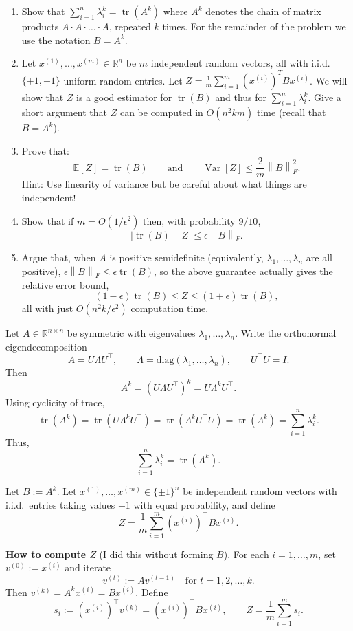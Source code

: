 \documentclass[10pt]{article}
\newcommand{\R}{\mathbb{R}}
\newcommand{\E}{\mathbb{E}}
\DeclareMathOperator{\Var}{Var}
\DeclareMathOperator{\tr}{tr}
\newcommand{\norm}[1]{\left\lVert #1\right\rVert}
\newcommand{\spara}[1]{\vspace{.5em}\noindent {\large\sffamily\textcolor{nyuOfficialPurple}{#1}}}
\begin{document}
\begin{enumerate}
	\item Show that $\sum_{i=1}^n \lambda_i^k = \tr(A^k)$ where $A^k$ denotes the chain of matrix products $A \cdot A \cdot \ldots \cdot A$, repeated $k$ times. For the remainder of the problem we use the notation $B = A^k$.
	\item Let $x^{(1)}, \ldots, x^{(m)} \in \R^n$ be $m$ independent random vectors, all with i.i.d. $\{+1, -1\}$ uniform random entries. Let $Z = \frac{1}{m} \sum_{i=1}^m (x^{(i)})^T B x^{(i)}$. We will show that $Z$ is a good estimator for $\tr(B)$ and thus for $\sum_{i=1}^n \lambda_i^k$. Give a short argument that $Z$ can be computed in $O(n^2 k m)$ time (recall that $B = A^k$).
	\item Prove that:
	\[
	\E[Z] = \tr(B)
	\qquad\text{and}\qquad
	\Var[Z] \le \frac{2}{m} \norm{B}_F^2.
	\]
	Hint: Use linearity of variance but be careful about what things are independent!
	\item Show that if $m = O(1/\epsilon^2)$ then, with probability $9/10$,
	\[
	|\tr(B) - Z| \le \epsilon \norm{B}_F.
	\]
	\item Argue that, when $A$ is positive semidefinite (equivalently, $\lambda_1, \ldots, \lambda_n$ are all positive), $\epsilon \norm{B}_F \le \epsilon \tr(B)$, so the above guarantee actually gives the relative error bound,
	\[
	(1-\epsilon)\tr(B) \le Z \le (1+\epsilon)\tr(B),
	\]
	all with just $O(n^2 k/\epsilon^2)$ computation time.
\end{enumerate}

\spara{Pr. 1(a)}
Let $A\in\R^{n\times n}$ be symmetric with eigenvalues $\lambda_1,\dots,\lambda_n$. Write the orthonormal eigendecomposition
\[
A = U\Lambda U^\top,
\qquad
\Lambda=\mathrm{diag}(\lambda_1,\dots,\lambda_n),
\qquad
U^\top U=I.
\]
Then
\[
A^k=(U\Lambda U^\top)^k = U\Lambda^k U^\top.
\]
Using cyclicity of trace,
\[
\tr(A^k)=\tr(U\Lambda^k U^\top)=\tr(\Lambda^k U^\top U)=\tr(\Lambda^k)
=\sum_{i=1}^n \lambda_i^k.
\]
Thus,
\[
\boxed{\sum_{i=1}^n \lambda_i^k=\tr(A^k).}
\]

\medskip
\spara{Pr. 1(b)}
Let $B:=A^k$. Let $x^{(1)},\dots,x^{(m)}\in\{\pm 1\}^n$ be independent random vectors with i.i.d.\ entries taking values $\pm 1$ with equal probability, and define
\[
Z=\frac{1}{m}\sum_{i=1}^m (x^{(i)})^\top Bx^{(i)}.
\]

\textbf{How to compute $Z$ }(I did this without forming $B$).
For each $i=1,\dots,m$, set $v^{(0)}:=x^{(i)}$ and iterate
\[
v^{(t)} := A v^{(t-1)} \quad \text{for }t=1,2,\dots,k.
\]
Then $v^{(k)} = A^k x^{(i)} = Bx^{(i)}$. Define
\[
s_i := (x^{(i)})^\top v^{(k)} = (x^{(i)})^\top Bx^{(i)},
\qquad
Z=\frac{1}{m}\sum_{i=1}^m s_i.
\]
\end{document}
